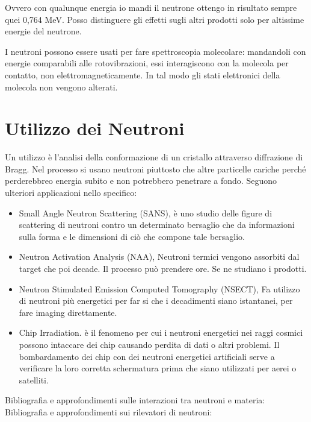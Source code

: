 Ovvero con qualunque energia io mandi il neutrone ottengo in risultato sempre quei 0,764 MeV. Posso distinguere gli effetti sugli altri prodotti solo per altissime energie del neutrone.

I neutroni possono essere usati per fare spettroscopia molecolare: mandandoli con energie comparabili alle rotovibrazioni, essi interagiscono con la molecola per contatto, non elettromagneticamente. In tal modo gli stati elettronici della molecola non vengono alterati. 

\section{Utilizzo dei Neutroni}

Un utilizzo è l'analisi della conformazione di un cristallo attraverso diffrazione di Bragg. Nel processo si usano neutroni piuttosto che altre particelle cariche perché perderebbreo energia subito e non potrebbero penetrare a fondo. 
Seguono ulteriori applicazioni nello specifico:

\begin{itemize}
\item Small Angle Neutron Scattering (SANS), è uno studio delle figure di scattering di neutroni contro un determinato bersaglio che da informazioni sulla forma e le dimensioni di ciò che compone tale bersaglio.
\item Neutron Activation Analysis (NAA), Neutroni termici vengono assorbiti dal target che poi decade. Il processo può prendere ore. Se ne studiano i prodotti.
\item Neutron Stimulated Emission Computed Tomography (NSECT), Fa utilizzo di neutroni più energetici per far si che i decadimenti siano istantanei, per fare imaging direttamente.
\item Chip Irradiation. è il fenomeno per cui i neutroni energetici nei raggi cosmici possono intaccare dei chip causando perdita di dati o altri problemi. Il bombardamento dei chip con dei neutroni energetici artificiali serve a verificare la loro corretta schermatura 
prima che siano utilizzati per aerei o satelliti.
\end{itemize}

Bibliografia e approfondimenti sulle interazioni tra neutroni e materia: \cite{Corvisiero} \cite{Assay}\\

Bibliografia e approfondimenti sui rilevatori di neutroni: \cite{Beringer2} \cite{Knoll}
